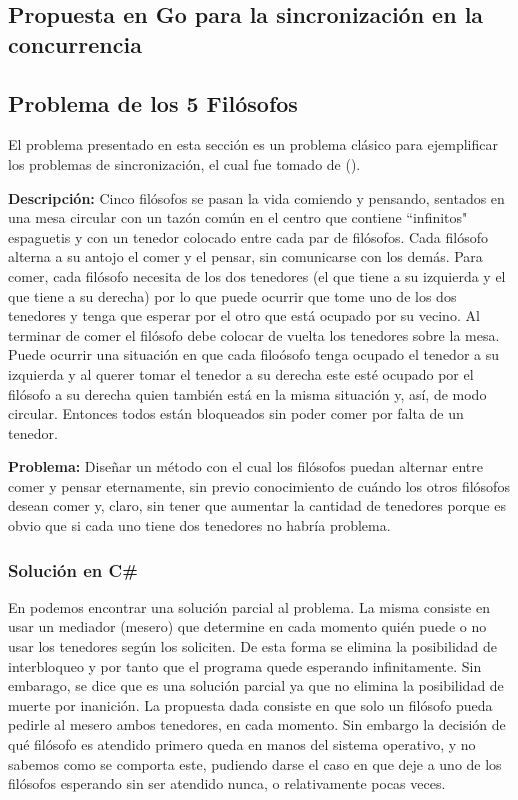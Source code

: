 \documentclass[10pt]{article} %
\begin{document}
\subsection{Propuesta en Go para la sincronización en la concurrencia}

\subsection{Problema de los 5 Fil\'osofos}

El problema presentado en esta secci\'on es un problema cl\'asico para ejemplificar los problemas de sincronizaci\'on,  el cual fue tomado de (\cite[Ep\'igrafe 17.7.2.1]{katrip}).

\textbf{Descripci\'on:} Cinco fil\'osofos se pasan la vida comiendo y pensando, sentados en una mesa circular con un taz\'on com\'un en el centro que contiene ``infinitos" espaguetis y con un tenedor colocado entre cada par de fil\'osofos. Cada fil\'osofo alterna a su antojo el comer y el pensar, sin comunicarse con los dem\'as. Para comer, cada fil\'osofo necesita de los dos tenedores (el que tiene a su izquierda y el que tiene a su derecha) por lo que puede ocurrir que tome uno de los dos tenedores y tenga que esperar por el otro que est\'a ocupado por su vecino. Al terminar de comer el fil\'osofo debe colocar de vuelta los tenedores sobre la mesa. Puede ocurrir una situaci\'on en que cada filo\'osofo tenga ocupado el tenedor a su izquierda y al querer tomar el tenedor a su derecha este est\'e ocupado por el fil\'osofo a su derecha quien tambi\'en est\'a en la misma situaci\'on y, as\'i, de modo circular. Entonces todos est\'an bloqueados sin poder comer por falta de un tenedor.

\textbf{Problema:} Dise\~nar un m\'etodo con el cual los fil\'osofos puedan alternar entre comer y pensar eternamente, sin previo conocimiento de cu\'ando los otros fil\'osofos desean comer y, claro, sin tener que aumentar la cantidad de tenedores porque es obvio que si cada uno tiene dos tenedores no habr\'ia problema.

\subsubsection{Soluci\'on en C\#}

En \cite[Ep\'igrafe 17.7.2.2]{katrib} podemos encontrar una soluci\'on parcial al problema. La misma consiste en usar un mediador (mesero) que determine en cada momento qui\'en puede o no usar los tenedores seg\'un los soliciten. De esta forma se elimina la posibilidad de interbloqueo y por tanto que el programa quede esperando infinitamente. Sin embarago, se dice que es una soluci\'on parcial ya que no elimina la posibilidad de muerte por inanici\'on. La propuesta dada consiste en que solo un fil\'osofo pueda pedirle al mesero ambos tenedores, en cada momento. Sin embargo la decisi\'on de qu\'e fil\'osofo es atendido primero queda en manos del sistema operativo, y no sabemos como se comporta este, pudiendo darse el caso en que deje a uno de los fil\'osofos esperando sin ser atendido nunca, o relativamente pocas veces.
\end{document}

